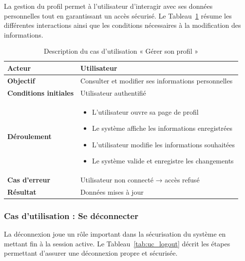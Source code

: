 La gestion du profil permet à l’utilisateur d’interagir avec ses données personnelles tout en garantissant un accès sécurisé. Le Tableau~\ref{tab:uc_profile} résume les différentes interactions ainsi que les conditions nécessaires à la modification des informations.

\begin{table}[H]
\centering
\renewcommand{\arraystretch}{1.2}
\begin{tabular}{|p{4cm}|p{10cm}|}
\hline
\textbf{Acteur} & Utilisateur \\ \hline

\textbf{Objectif} & Consulter et modifier ses informations personnelles \\ \hline

\textbf{Conditions initiales} & Utilisateur authentifié \\ \hline

\textbf{Déroulement} &
\begin{itemize}
    \item L’utilisateur ouvre sa page de profil
    \item Le système affiche les informations enregistrées
    \item L’utilisateur modifie les informations souhaitées
    \item Le système valide et enregistre les changements
\end{itemize} \\ \hline

\textbf{Cas d’erreur} & Utilisateur non connecté → accès refusé \\ \hline

\textbf{Résultat} & Données mises à jour \\ \hline
\end{tabular}
\caption{Description du cas d’utilisation « Gérer son profil »}
\label{tab:uc_profile}
\end{table}

\subsubsection{Cas d’utilisation : Se déconnecter}

La déconnexion joue un rôle important dans la sécurisation du système en mettant fin à la session active. Le Tableau~\ref{tab:uc_logout} décrit les étapes permettant d’assurer une déconnexion propre et sécurisée.

